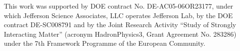 \documentclass[preprintnumbers,floatfix,nofootinbib]{revtex4}
\begin{document}

\begin{acknowledgments}
This work was supported by DOE contract No. DE-AC05-06OR23177,
under which Jefferson Science Associates, LLC operates Jefferson Lab, by the DOE contract DE-SC008791 and 
by the Joint Research Activity ``Study of Strongly
Interacting Matter'' (acronym HadronPhysics3, Grant Agreement No. 283286) under
the 7th Framework Programme of the European Community.
\end{acknowledgments}




\end{document}
